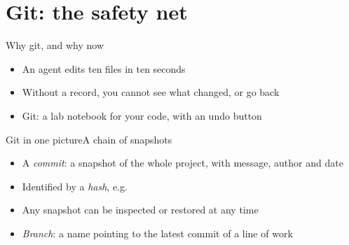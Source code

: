 \section{Git: the safety net}

\begin{frame}{Why git, and why now}
  \begin{itemize}
    \item An agent edits ten files in ten seconds
    \item Without a record, you cannot see what changed, or go back
    \item<2-> Git: a lab notebook for your code, with an undo button
  \end{itemize}

  \vspace{3ex}
\end{frame}

\begin{frame}{Git in one picture}{A chain of snapshots}
  \vspace{2ex}
  \begin{center}
  \end{center}
  \vspace{1ex}

  \begin{itemize}
    \item A \emph{commit}: a snapshot of the whole project, with message, author and date
    \item<2-> Identified by a \emph{hash}, e.g.\ 
    \item<3-> Any snapshot can be inspected or restored at any time
    \item<4-> \emph{Branch}: a name pointing to the latest commit of a line of work
  \end{itemize}
\end{frame}

